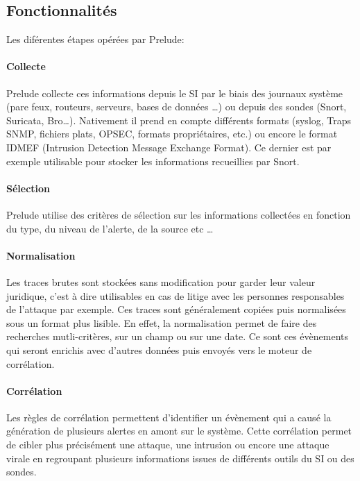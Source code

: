 \documentclass[a4paper,11pt,french]{article}
\begin{document}
\subsection{Fonctionnalités}

Les diférentes étapes opérées par Prelude:
\paragraph{Collecte} Prelude collecte ces informations depuis le SI par le biais des journaux système (pare feux, routeurs, serveurs, bases de données …) ou depuis des sondes (Snort, Suricata, Bro…). Nativement il prend en compte différents formats (syslog, Traps SNMP, fichiers plats, OPSEC, formats propriétaires, etc.) ou encore le format IDMEF (Intrusion Detection Message Exchange Format). Ce dernier est par exemple utilisable pour stocker les informations recueillies par Snort.

\paragraph{Sélection} Prelude utilise des critères de sélection sur les informations collectées en fonction du type, du niveau de l’alerte, de la source etc …

\paragraph{Normalisation} Les traces brutes sont stockées sans modification pour garder leur valeur juridique, c’est à dire utilisables en cas de litige avec les personnes responsables de l’attaque par exemple. Ces traces sont généralement copiées puis normalisées sous un format plus lisible. En effet, la normalisation permet de faire des recherches mutli-critères, sur un champ ou sur une date. Ce sont ces évènements qui seront enrichis avec d'autres données puis envoyés vers le moteur de corrélation.

\paragraph{Corrélation} Les règles de corrélation permettent d'identifier un évènement qui a causé la génération de plusieurs alertes en amont sur le système. Cette corrélation permet de cibler plus précisément une attaque, une intrusion ou encore une attaque virale en regroupant plusieurs informations issues de différents outils du SI ou des sondes.
~~\\
\end{document}
